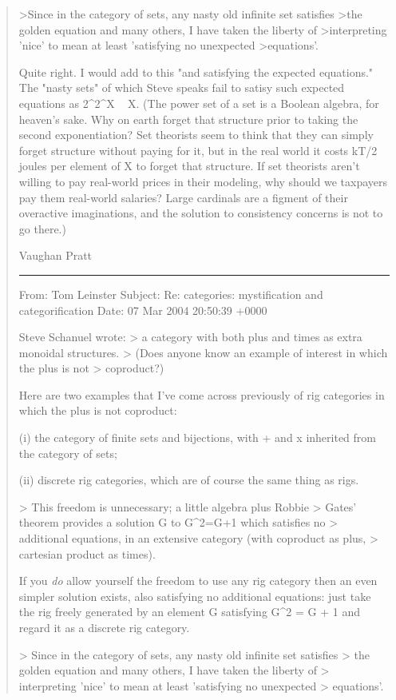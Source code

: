 \begin{quote}
>Since in the category of sets, any nasty old infinite set satisfies
>the golden equation and many others, I have taken the liberty of
>interpreting 'nice' to mean at least 'satisfying no unexpected
>equations'.

Quite right.  I would add to this "and satisfying the expected equations."
The "nasty sets" of which Steve speaks fail to satisy such expected
equations as 2^2^X ~ X.  (The power set of a set is a Boolean algebra,
for heaven's sake.  Why on earth forget that structure prior to taking the
second exponentiation?  Set theorists seem to think that they can simply
forget structure without paying for it, but in the real world it costs
kT/2 joules per element of X to forget that structure.  If set theorists
aren't willing to pay real-world prices in their modeling, why should we
taxpayers pay them real-world salaries?  Large cardinals are a figment of
their overactive imaginations, and the solution to consistency concerns is
not to go there.)

Vaughan Pratt


\par\noindent\rule{\textwidth}{0.4pt}


From: Tom Leinster 
Subject: Re: categories: mystification and categorification
Date: 07 Mar 2004 20:50:39 +0000

Steve Schanuel wrote:
> a category with both plus and times as extra monoidal structures.
> (Does anyone know an example of interest in which the plus is not
> coproduct?) 

Here are two examples that I've come across previously of rig categories
in which the plus is not coproduct:

(i) the category of finite sets and bijections, with + and x inherited
from the category of sets;

(ii) discrete rig categories, which are of course the same thing as
rigs.

> This freedom is unnecessary; a little algebra plus Robbie
> Gates' theorem provides a solution G to  G^2=G+1 which satisfies no
> additional equations, in an extensive category (with coproduct as plus,
> cartesian product as times).

If you \emph{do} allow yourself the freedom to use any rig category then an
even simpler solution exists, also satisfying no additional equations:
just take the rig freely generated by an element G satisfying G^2 = G +
1 and regard it as a discrete rig category.

>     Since in the category of sets, any nasty old infinite set satisfies
> the golden equation and many others, I have taken the liberty of
> interpreting  'nice' to mean at least 'satisfying no unexpected
> equations'.


\end{quote}
